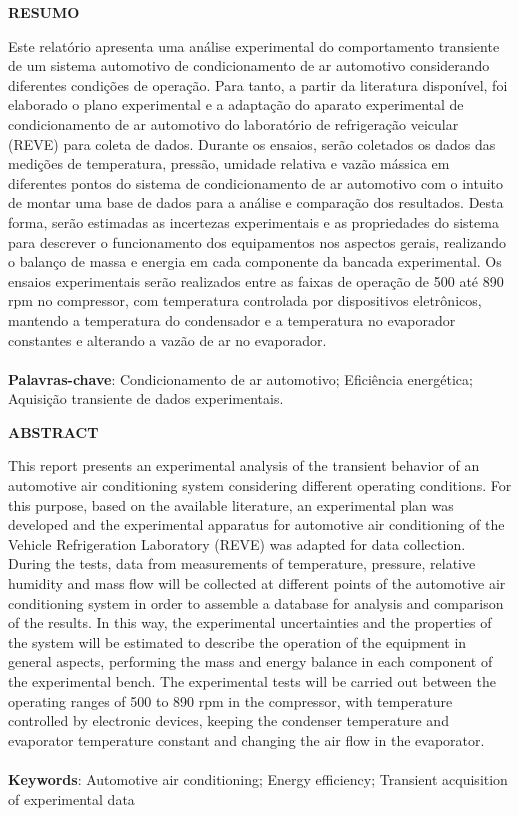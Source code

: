 \begin{center}
    \textbf{RESUMO}
\end{center}

{\fontsize{12pt}{14pt}\selectfont \noindent Este relatório apresenta uma análise experimental do comportamento transiente de um sistema automotivo de condicionamento de ar automotivo considerando diferentes condições de operação. Para tanto, a partir da literatura disponível, foi elaborado o plano experimental e a adaptação do aparato experimental de condicionamento de ar automotivo do laboratório de refrigeração veicular (REVE) para coleta de dados. Durante os ensaios, serão coletados os dados das medições de temperatura, pressão, umidade relativa e vazão mássica em diferentes pontos do sistema de condicionamento de ar automotivo com o intuito de montar uma base de dados para a análise e comparação dos resultados. Desta forma, serão estimadas as incertezas experimentais e as propriedades do sistema para descrever o funcionamento dos equipamentos nos aspectos gerais, realizando o balanço de massa e energia em cada componente da bancada experimental. Os ensaios experimentais serão realizados entre as faixas de operação de 500 até 890 rpm no compressor, com temperatura controlada por dispositivos eletrônicos, mantendo a temperatura do condensador e a temperatura no evaporador constantes e alterando a vazão de ar no evaporador.
\\\\
\noindent \textbf{Palavras-chave}: Condicionamento de ar automotivo; Eficiência energética; Aquisição transiente de dados experimentais.
}
\newpage

\begin{center}
    \textbf{ABSTRACT}
\end{center}

{\fontsize{12pt}{14pt}\selectfont \noindent 
This report presents an experimental analysis of the transient behavior of an automotive air conditioning system considering different operating conditions. For this purpose, based on the available literature, an experimental plan was developed and the experimental apparatus for automotive air conditioning of the Vehicle Refrigeration Laboratory (REVE) was adapted for data collection. During the tests, data from measurements of temperature, pressure, relative humidity and mass flow will be collected at different points of the automotive air conditioning system in order to assemble a database for analysis and comparison of the results. In this way, the experimental uncertainties and the properties of the system will be estimated to describe the operation of the equipment in general aspects, performing the mass and energy balance in each component of the experimental bench. The experimental tests will be carried out between the operating ranges of 500 to 890 rpm in the compressor, with temperature controlled by electronic devices, keeping the condenser temperature and evaporator temperature constant and changing the air flow in the evaporator.
\\\\
\noindent\textbf{Keywords}: Automotive air conditioning; Energy efficiency; Transient acquisition of experimental data
}
\onehalfspacing